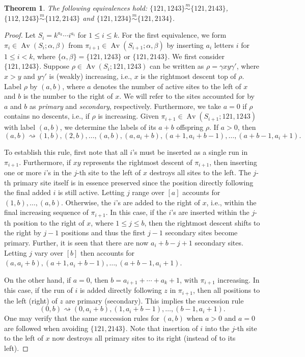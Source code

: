 \documentclass[11pt]{amsart}
\theoremstyle{plain}
\newtheorem{theorem}{Theorem}[section]
\theoremstyle{definition}
\newcommand{\csim}{\stackrel{m}{\sim}}
\DeclareMathOperator{\Av}{Av}
\begin{document}
\begin{theorem}\label{121,1243}
The following equivalences hold:  $\{121,1243\}\csim\{121,2143\}$,
$\{112,1243\}\csim\{112,2143\}$ and $\{121,1234\}\csim\{121,2134\}$.
\end{theorem}
\begin{proof}
Let $S_i=k^{a_k}\cdots i^{a_i}$ for $1 \leq i \leq k$. For the first equivalence, we form $\pi_i
\in \Av(S_i;\alpha,\beta)$ from $\pi_{i+1}\in \Av(S_{i+1};\alpha,\beta)$ by inserting $a_i$
letters $i$ for $1 \leq i <k$, where $\{\alpha,\beta\}=\{121,1243\}$ or $\{121,2143\}$.  We first
consider $\{121,1243\}$.  Suppose $\rho \in \Av(S_i;121,1243)$ can be written as $\rho=\gamma xy
\gamma'$, where $x>y$ and $y\gamma'$ is (weakly) increasing, i.e., $x$ is the rightmost descent top
of $\rho$.  Label $\rho$ by $(a,b)$, where $a$ denotes the number of active sites to the left of $x$
and $b$ is the number to the right of $x$.  We will refer to the sites accounted for by $a$ and $b$
as \emph{primary} and \emph{secondary}, respectively.  Furthermore, we take $a=0$ if $\rho$ contains
no descents, i.e., if $\rho$ is increasing. Given $\pi_{i+1}\in \Av(S_{i+1};121,1243)$ with label
$(a,b)$, we determine the labels of its $a+b$ offspring $\rho$.  If $a>0$, then
$$(a,b)\rightsquigarrow(1,b),(2,b),\ldots,(a,b),(a,a_i+b),(a+1,a_i+b-1),\ldots,(a+b-1,a_i+1).$$

To establish this rule, first note that all $i$'s must be inserted as a single run in $\pi_{i+1}$.
Furthermore, if $xy$ represents the rightmost descent of $\pi_{i+1}$, then inserting one or more
$i$'s in the $j$-th site to the left of $x$ destroys all sites to the left.  The $j$-th primary site
itself is in essence preserved since the position directly following the final added $i$ is still
active.  Letting $j$ range over $[a]$ accounts for $(1,b),\ldots,(a,b)$.  Otherwise, the $i$'s are
added to the right of $x$, i.e., within the final increasing sequence of $\pi_{i+1}$.  In this case,
if the $i$'s are inserted within the $j$-th position to the right of $x$, where $1 \leq j \leq b$,
then the rightmost descent shifts to the right by $j-1$ positions and thus the first $j-1$ secondary
sites become primary.  Further, it is seen that there are now $a_i+b-j+1$ secondary sites.  Letting
$j$ vary over $[b]$ then accounts for $(a,a_i+b),(a+1,a_i+b-1),\ldots,(a+b-1,a_i+1)$.

On the other hand, if $a=0$, then $b=a_{i+1}+\cdots+a_k+1$, with $\pi_{i+1}$ increasing.  In this case,
if the run of $i$ is added directly following $z$ in $\pi_{i+1}$, then all positions to the left
(right) of $z$ are primary (secondary).  This implies the succession rule
$$(0,b)\rightsquigarrow(0,a_i+b),(1,a_i+b-1),\ldots,(b-1,a_i+1).$$
One may verify that the same succession rules for $(a,b)$ when $a>0$ and $a=0$ are followed when
avoiding $\{121,2143\}$.  Note that insertion of $i$ into the $j$-th site to the left of $x$ now
destroys all primary sites to its right (instead of to its left).


\end{proof}
\end{document}
